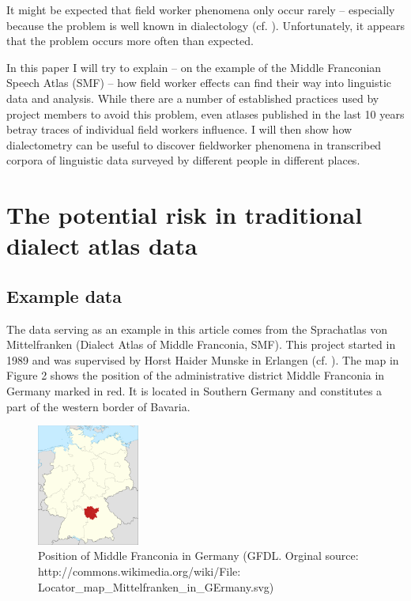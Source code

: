 \documentclass[output=paper]{LSP/langsci}
\begin{document}
It might be expected that field worker phenomena only occur rarely – especially because the problem is well known in dialectology (cf. \citealt[59--73]{hotzenkocherle_einfuhrung_1962}). Unfortunately, it appears that the problem occurs more often than expected.

In this paper I will try to explain – on the example of the Middle Franconian Speech Atlas (SMF) – how field worker effects can find their way into linguistic data and analysis. While there are a number of established practices used by project members to avoid this problem, even atlases published in the last 10 years betray traces of individual field workers{\textquotesingle} influence. I will then show how dialectometry can be useful to discover fieldworker phenomena in transcribed corpora of linguistic data surveyed by different people in different places.

\section{The potential risk in traditional dialect atlas data}

\subsection{Example data}
The data serving as an example in this article comes from the Sprachatlas von Mittelfranken (Dialect Atlas of Middle Franconia, SMF). This project started in 1989 and was supervised by Horst Haider Munske in Erlangen (cf. \citealt[11]{munske_zur_2013}). The map in Figure 2 shows the position of the administrative district Middle Franconia in Germany marked in red. It is located in Southern Germany and constitutes a part of the western border of Bavaria.

\begin{figure}
\includegraphics[width=0.3\textwidth]{illustrations/mathus_fig2}
\caption{Position of Middle Franconia in Germany (GFDL. Orginal source: http://commons.wikimedia.org/wiki/File: Locator\_map\_Mittelfranken\_in\_GErmany.svg)}
\label{fig:2}
\end{figure}
\end{document}
